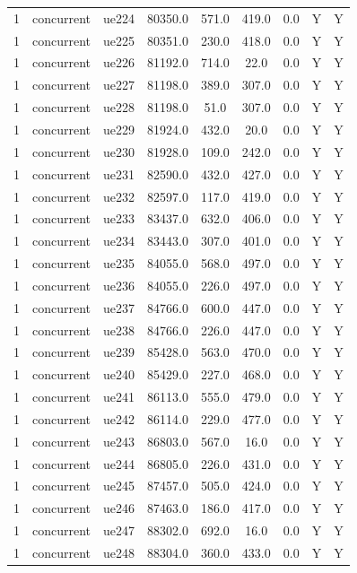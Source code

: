 \begin{table}[ht]
\begin{tabular}{|c|c|c|c|c|c|c|c|c|}
1 & concurrent & ue224 & 80350.0 & 571.0 & 419.0 & 0.0 & Y & Y \\
1 & concurrent & ue225 & 80351.0 & 230.0 & 418.0 & 0.0 & Y & Y \\
1 & concurrent & ue226 & 81192.0 & 714.0 & 22.0 & 0.0 & Y & Y \\
1 & concurrent & ue227 & 81198.0 & 389.0 & 307.0 & 0.0 & Y & Y \\
1 & concurrent & ue228 & 81198.0 & 51.0 & 307.0 & 0.0 & Y & Y \\
1 & concurrent & ue229 & 81924.0 & 432.0 & 20.0 & 0.0 & Y & Y \\
1 & concurrent & ue230 & 81928.0 & 109.0 & 242.0 & 0.0 & Y & Y \\
1 & concurrent & ue231 & 82590.0 & 432.0 & 427.0 & 0.0 & Y & Y \\
1 & concurrent & ue232 & 82597.0 & 117.0 & 419.0 & 0.0 & Y & Y \\
1 & concurrent & ue233 & 83437.0 & 632.0 & 406.0 & 0.0 & Y & Y \\
1 & concurrent & ue234 & 83443.0 & 307.0 & 401.0 & 0.0 & Y & Y \\
1 & concurrent & ue235 & 84055.0 & 568.0 & 497.0 & 0.0 & Y & Y \\
1 & concurrent & ue236 & 84055.0 & 226.0 & 497.0 & 0.0 & Y & Y \\
1 & concurrent & ue237 & 84766.0 & 600.0 & 447.0 & 0.0 & Y & Y \\
1 & concurrent & ue238 & 84766.0 & 226.0 & 447.0 & 0.0 & Y & Y \\
1 & concurrent & ue239 & 85428.0 & 563.0 & 470.0 & 0.0 & Y & Y \\
1 & concurrent & ue240 & 85429.0 & 227.0 & 468.0 & 0.0 & Y & Y \\
1 & concurrent & ue241 & 86113.0 & 555.0 & 479.0 & 0.0 & Y & Y \\
1 & concurrent & ue242 & 86114.0 & 229.0 & 477.0 & 0.0 & Y & Y \\
1 & concurrent & ue243 & 86803.0 & 567.0 & 16.0 & 0.0 & Y & Y \\
1 & concurrent & ue244 & 86805.0 & 226.0 & 431.0 & 0.0 & Y & Y \\
1 & concurrent & ue245 & 87457.0 & 505.0 & 424.0 & 0.0 & Y & Y \\
1 & concurrent & ue246 & 87463.0 & 186.0 & 417.0 & 0.0 & Y & Y \\
1 & concurrent & ue247 & 88302.0 & 692.0 & 16.0 & 0.0 & Y & Y \\
1 & concurrent & ue248 & 88304.0 & 360.0 & 433.0 & 0.0 & Y & Y \\

\end{tabular}
\end{table}
